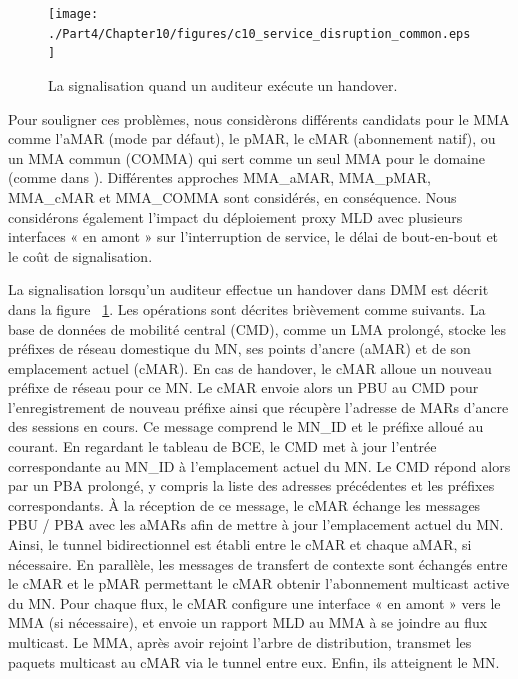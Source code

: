 \begin{figure}[tb!] 
  \begin{center} 
    \texttt{[image: ./Part4/Chapter10/figures/c10\_service\_disruption\_common.eps]} 
    \caption[La signalisation quand un auditeur exécute un handover.]{La signalisation quand un auditeur exécute un handover.}
    \label{fig:c10_HO}
  \end{center} 
\end{figure}

Pour souligner ces problèmes, nous considèrons différents candidats pour le MMA comme l'aMAR (mode par défaut), le pMAR, le cMAR (abonnement natif), ou un MMA commun (COMMA) qui sert comme un seul MMA pour le domaine (comme dans \cite{direct_routing_mtma}). Différentes approches MMA\_aMAR, MMA\_pMAR, MMA\_cMAR et MMA\_COMMA sont considérés, en conséquence. Nous considérons également l'impact du déploiement proxy MLD avec plusieurs interfaces « en amont » sur l'interruption de service, le délai de bout-en-bout et le coût de signalisation.

La signalisation lorsqu'un auditeur effectue un handover dans DMM est décrit dans la figure ~\ref{fig:c10_HO}. Les opérations sont décrites brièvement comme suivants. La base de données de mobilité central (CMD), comme un LMA prolongé, stocke les préfixes de réseau domestique du MN, ses points d'ancre (aMAR) et de son emplacement actuel (cMAR). En cas de handover, le cMAR alloue un nouveau préfixe de réseau pour ce MN. Le cMAR envoie alors un PBU au CMD pour l'enregistrement de nouveau préfixe ainsi que récupère l'adresse de MARs d'ancre des sessions en cours. Ce message comprend le MN\_ID et le préfixe alloué au courant. En regardant le tableau de BCE, le CMD met à jour l'entrée correspondante au MN\_ID à l'emplacement actuel du MN. Le CMD répond alors par un PBA prolongé, y compris la liste des adresses précédentes et les préfixes correspondants. À la réception de ce message, le cMAR échange les messages PBU / PBA avec les aMARs afin de mettre à jour l'emplacement actuel du MN. Ainsi, le tunnel bidirectionnel est établi entre le cMAR et chaque aMAR, si nécessaire. En parallèle, les messages de transfert de contexte sont échangés entre le cMAR et le pMAR permettant le cMAR obtenir l'abonnement multicast active du MN. Pour chaque flux, le cMAR configure une interface « en amont » vers le MMA (si nécessaire), et envoie un rapport MLD au MMA à se joindre au flux multicast. Le MMA, après avoir rejoint l'arbre de distribution, transmet les paquets multicast au cMAR via le tunnel entre eux. Enfin, ils atteignent le MN.

